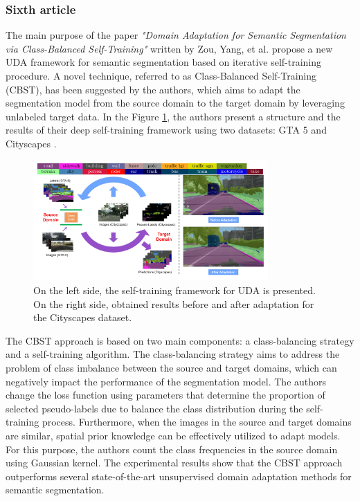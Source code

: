\subsubsection{Sixth article}

The main purpose of the paper \textit{"Domain Adaptation for Semantic Segmentation via Class-Balanced Self-Training"} written by Zou, Yang, et al. \cite{zou2018unsupervised} propose a new UDA framework for semantic segmentation based on iterative self-training procedure. A novel technique, referred to as Class-Balanced Self-Training (CBST), has been suggested by the authors, which aims to adapt the segmentation model from the source domain to the target domain by leveraging unlabeled target data. In the Figure \ref{fig: sem_seg}, the authors present a structure and the results of their deep self-training framework using two datasets: GTA 5 \cite{richter2016playing} and Cityscapes \cite{cordts2016cityscapes}.

\begin{figure}[H]
    \centering
    \includegraphics[width=0.8\textwidth]{Figures/From articles/semantic_segmentation.png}
    \caption{ On the left side, the self-training framework for UDA is presented. On the right side, obtained results before and after adaptation for the Cityscapes dataset.}
    \label{fig: sem_seg}
\end{figure}

The CBST approach is based on two main components: a class-balancing strategy and a self-training algorithm. The class-balancing strategy aims to address the problem of class imbalance between the source and target domains, which can negatively impact the performance of the segmentation model. The authors change the loss function using parameters that determine the proportion of selected pseudo-labels due to balance the class distribution during the self-training process. Furthermore, when the images in the source and target domains are similar, spatial prior knowledge can be effectively utilized to adapt models. For this purpose, the authors count the class frequencies in the source domain using Gaussian kernel. The experimental results show that the CBST approach outperforms several state-of-the-art unsupervised domain adaptation methods for semantic segmentation. 